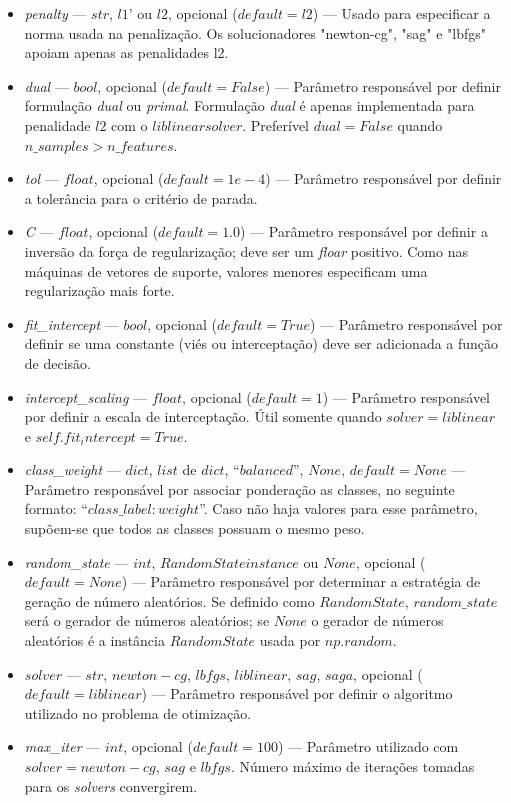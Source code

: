 \documentclass[
	12pt,				%
	oneside,			%
	a4paper,			%
	english,			%
	brazil				%
	]{abntex2ppgsi}
\begin{document}
{{\begin{apendicesenv}
\begin{itemize}
\item \textit{penalty} --- $str$, $l1’$ ou $l2$, opcional ($default=l2$) --- Usado para especificar a norma usada na penalização. Os solucionadores "newton-cg", "sag" e "lbfgs" apoiam apenas as penalidades l2.
\item \textit{dual} --- $bool$, opcional ($default=False$) --- Parâmetro responsável por definir formulação \textit{dual} ou \textit{primal}. Formulação \textit{dual} é apenas implementada para penalidade $l2$ com o $liblinear solver$. Preferível $dual=False$ quando $n\_samples > n\_features$.
\item \textit{tol} --- $float$, opcional ($default=1e-4$) --- Parâmetro responsável por definir a tolerância para o critério de parada.
\item \textit{C}  --- $float$, opcional ($default=1.0$) --- Parâmetro responsável por definir a inversão da força de regularização; deve ser um \textit{floar} positivo. Como nas máquinas de vetores de suporte, valores menores especificam uma regularização mais forte.
\item \textit{fit\_intercept} --- $bool$, opcional ($default=True$) --- Parâmetro responsável por definir se uma constante (viés ou interceptação) deve ser adicionada a função de decisão.
\item \textit{intercept\_scaling} --- $float$, opcional ($default=1$) --- Parâmetro responsável por definir a escala de interceptação. Útil somente quando $solver=liblinear$ e $self.fit_intercept=True$.
\item \textit{class\_weight} --- $dict$, $list$ de $dict$, ``$balanced$'', $None$, $default=None$ --- Parâmetro responsável por associar ponderação as classes, no seguinte formato: ``${class\_label: weight}$''. Caso não haja valores para esse parâmetro, supõem-se que todos as classes possuam o mesmo peso. 
\item \textit{random\_state} --- $int$, $RandomState instance$ ou $None$, opcional ($default=None$) --- Parâmetro responsável por determinar a estratégia de geração de número aleatórios. Se definido como $RandomState$, $random\_state$ será o gerador de números aleatórios; se $None$ o gerador de números aleatórios é a instância $RandomState$ usada por $np.random$.
\item $solver$ --- $str$, $newton-cg$, $lbfgs$, $liblinear$, $sag$, $saga$, opcional ($default=liblinear$) --- Parâmetro responsável por definir o algoritmo utilizado no problema de otimização.
\item \textit{max\_iter} --- $int$, opcional ($default=100$) --- Parâmetro utilizado com $solver=newton-cg$, $sag$ e $lbfgs$. Número máximo de iterações tomadas para os \textit{solvers} convergirem.

\end{itemize}
\end{apendicesenv}}}
\end{document}
